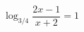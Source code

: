 \begin{ex}[type=equation]
	\begin{condition}
		$\log_{3/4}\dfrac{2x - 1}{x + 2} = 1$
	\end{condition}
\end{ex}
